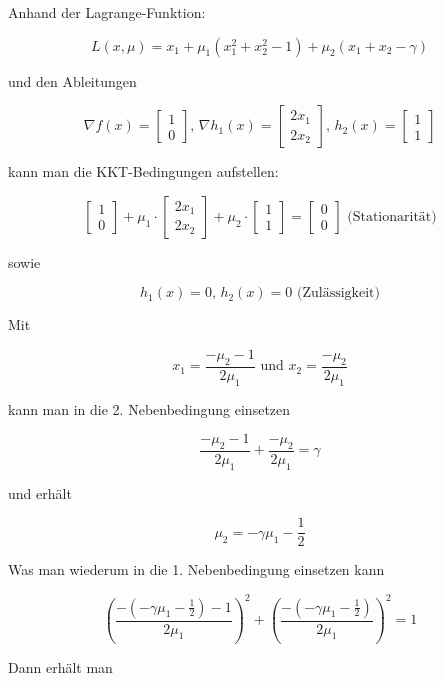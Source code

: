 \documentclass[a4paper, 12pt]{report}
\begin{document}
Anhand der Lagrange-Funktion:

$$L(x,\mu) = x_1 + \mu_1\left( x_1^2 + x_2^2 - 1 \right) + \mu_2\left( x_1 + x_2 - \gamma \right)$$

und den Ableitungen

$$\nabla f(x) = \begin{bmatrix}1 \\ 0\end{bmatrix} \text{, } \nabla h_1(x) = \begin{bmatrix}2x_1\\2x_2\end{bmatrix} \text{, } h_2(x) = \begin{bmatrix}1\\1\end{bmatrix}$$

kann man die KKT-Bedingungen aufstellen:

$$\begin{bmatrix}1 \\ 0\end{bmatrix} + \mu_1 \cdot \begin{bmatrix}2x_1\\2x_2\end{bmatrix} + \mu_2 \cdot \begin{bmatrix}1\\1\end{bmatrix} = \begin{bmatrix}0\\0\end{bmatrix} \text{ (Stationarität)}$$

sowie

$$h_1(x) = 0 \text{, } h_2(x) = 0 \text{ (Zulässigkeit)}$$

Mit

$$x_1 = \frac{-\mu_2 - 1}{2\mu_1} \text{ und } x_2 = \frac{-\mu_2}{2\mu_1}$$

kann man in die 2. Nebenbedingung einsetzen

$$ \frac{-\mu_2 - 1}{2\mu_1} + \frac{-\mu_2}{2\mu_1} = \gamma$$

und erhält

$$\mu_2 = -\gamma\mu_1 - \frac{1}{2}$$

Was man wiederum in die 1. Nebenbedingung einsetzen kann

$$ \left( \frac{-\left(-\gamma\mu_1 - \frac{1}{2}\right) - 1}{2\mu_1} \right)^2 + \left( \frac{-\left(-\gamma\mu_1 - \frac{1}{2}\right)}{2\mu_1} \right)^2 = 1$$

Dann erhält man
\end{document}
